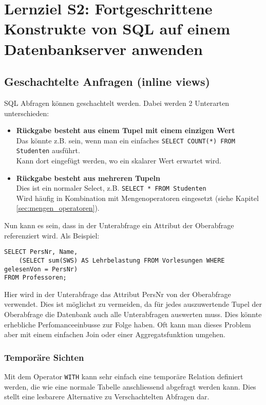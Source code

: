 \section{Lernziel S2: Fortgeschrittene Konstrukte von SQL auf einem Datenbankserver anwenden}

\subsection{Geschachtelte Anfragen (inline views)}

SQL Abfragen können geschachtelt werden. Dabei werden 2 Unterarten unterschieden:

\begin{itemize}
  \item \textbf{Rückgabe besteht aus einem Tupel mit einem einzigen Wert} \\
  Das könnte z.B. sein, wenn man ein einfaches \texttt{SELECT COUNT(*) FROM Studenten} ausführt. \\
  Kann dort eingefügt werden, wo ein skalarer Wert erwartet wird.
  \item \textbf{Rückgabe besteht aus mehreren Tupeln} \\
  Dies ist ein normaler Select, z.B. \texttt{SELECT * FROM Studenten} \\
  Wird häufig in Kombination mit Mengenoperatoren eingesetzt (siehe Kapitel \ref{sec:mengen_operatoren}).
\end{itemize}

Nun kann es sein, dass in der Unterabfrage ein Attribut der Oberabfrage referenziert wird. Als Beispiel:

\begin{lstlisting}[caption={Korrelierte Unterabfrage},label=lst:unterabfrage_korreliert]
SELECT PersNr, Name,
	(SELECT sum(SWS) AS Lehrbelastung FROM Vorlesungen WHERE gelesenVon = PersNr)
FROM Professoren;
\end{lstlisting}

Hier wird in der Unterabfrage das Attribut PersNr von der Oberabfrage verwendet. Dies ist möglichst zu vermeiden, da für jedes auszuwertende Tupel der Oberabfrage die Datenbank auch alle Unterabfragen auswerten muss. Dies könnte erhebliche Perfomanceeinbusse zur Folge haben. Oft kann man dieses Problem aber mit einem einfachen Join oder einer Aggregatsfunktion umgehen.

\subsubsection{Temporäre Sichten}
Mit dem Operator \texttt{WITH} kann sehr einfach eine temporäre Relation definiert werden, die wie eine normale Tabelle anschliessend abgefragt werden kann. Dies stellt eine lesbarere Alternative zu Verschachtelten Abfragen dar.

